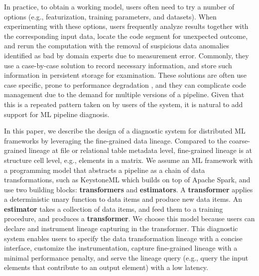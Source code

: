 \documentclass{sig-alternate}
\begin{document}
In practice, to obtain a working model, users often need to try a number of options (e.g., featurization, training parameters, and datasets). 
When experimenting with these options, users frequently analyze results together with the corresponding input data,  
locate the code segment for unexpected outcome, and rerun the computation with the removal of suspicious data anomalies
identified as bad by domain experts due to measurement error.
Commonly, they use a case-by-case solution to record necessary information, and store such information in persistent storage for examination.
These solutions are often use case specific, prone to performance degradation , and they can complicate code
management due to the demand for multiple versions of a pipeline.
Given that this is a repeated pattern taken on by users of the system, it is natural to add support 
for ML pipeline diagnosis.

In this paper, we describe the design of a diagnostic system for distributed ML frameworks by leveraging the fine-grained data lineage.
Compared to the coarse-grained lineage at file or relational table metadata level, fine-grained lineage is at structure cell level, e.g., elements in a matrix. 
We assume an ML framework with a programming model that abstracts a pipeline as a chain of data transformations, such as KeystoneML
which builds on top of Apache Spark, and use two building blocks: {\bf transformers} and {\bf estimators}.
A {\bf transformer} applies a deterministic unary function to data items and produce new data items.
An {\bf estimator} takes a collection of data items, and feed them to a training procedure,  and produces a {\bf transformer}.
We choose this model because users can declare and instrument lineage capturing in the transformer.
This diagnostic system enables users to specify the data transformation lineage with a concise interface, customize the instrumentation, 
capture fine-grained lineage with a minimal performance penalty, and serve the lineage query 
(e.g., query the input elements that contribute to an output element) with a low latency. 
\end{document}
